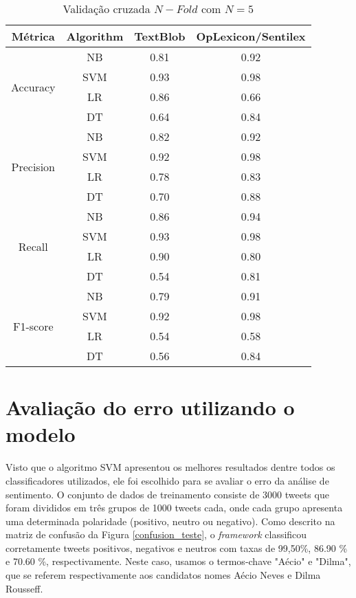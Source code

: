  
 \begin{table}[tbp]
     \centering
     \caption{Validação cruzada $N-Fold$ com $N=5$ }
     \label{tb:fold}
     \begin{tabular}{@{}cccc@{}}
     \toprule  \hline
     Métrica & Algorithm & TextBlob & OpLexicon/Sentilex \\  \hline
     \multirow{4}{*}{Accuracy} & NB & 0.81 & 0.92 \\ 
      & SVM & 0.93 & 0.98 \\ 
      & LR & 0.86 & 0.66 \\ 
      & DT & 0.64 & 0.84  \\  \hline
     \multirow{4}{*}{Precision} & NB & 0.82 & 0.92 \\ 
      & SVM & 0.92 & 0.98 \\ 
      & LR & 0.78 & 0.83 \\ 
      & DT & 0.70  & 0.88  \\ \hline
     \multirow{4}{*}{Recall} & NB & 0.86 & 0.94 \\ 
      & SVM & 0.93 & 0.98 \\ 
      & LR & 0.90 & 0.80 \\ 
      & DT & 0.54  & 0.81  \\ \hline 
     \multirow{4}{*}{F1-score} & NB & 0.79 & 0.91 \\ 
      & SVM & 0.92 & 0.98 \\ 
      & LR & 0.54 & 0.58 \\
      & DT & 0.56 & 0.84  \\ \hline
     \end{tabular}
     \end{table}
 
 \newpage
 
 \section{Avaliação do erro utilizando o modelo}
 
 Visto que o algoritmo \acrshort{SVM} apresentou os melhores resultados dentre todos os classificadores utilizados, 
 ele foi escolhido para se avaliar o erro da análise de sentimento. O conjunto de dados de treinamento consiste
 de 3000 tweets que foram divididos em três grupos de
 1000 tweets cada, onde cada grupo apresenta uma determinada polaridade
 (positivo, neutro ou negativo). Como descrito na matriz de confusão da Figura \ref{confusion_teste}, o \textit{framework} classificou corretamente
 tweets positivos, negativos e neutros com taxas de 99,50\%,
 86.90 \% e 70.60 \%, respectivamente. Neste caso, usamos o
 termos-chave "Aécio" e "Dilma", que se referem respectivamente aos candidatos
 nomes Aécio Neves e Dilma Rousseff.
 
